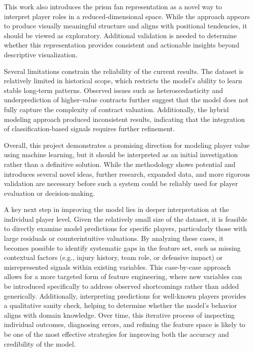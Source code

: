 \documentclass[conference]{IEEEtran}
\begin{document}
This work also introduces the prism fan representation as a novel way to interpret player roles in a reduced-dimensional space. While the approach appears to produce visually meaningful structure and aligns with positional tendencies, it should be viewed as exploratory. Additional validation is needed to determine whether this representation provides consistent and actionable insights beyond descriptive visualization.

Several limitations constrain the reliability of the current results. The dataset is relatively limited in historical scope, which restricts the model's ability to learn stable long-term patterns. Observed issues such as heteroscedasticity and underprediction of higher-value contracts further suggest that the model does not fully capture the complexity of contract valuation. Additionally, the hybrid modeling approach produced inconsistent results, indicating that the integration of classification-based signals requires further refinement.

Overall, this project demonstrates a promising direction for modeling player value using machine learning, but it should be interpreted as an initial investigation rather than a definitive solution. While the methodology shows potential and introduces several novel ideas, further research, expanded data, and more rigorous validation are necessary before such a system could be reliably used for player evaluation or decision-making.

A key next step in improving the model lies in deeper interpretation at the individual player level. Given the relatively small size of the dataset, it is feasible to directly examine model predictions for specific players, particularly those with large residuals or counterintuitive valuations. By analyzing these cases, it becomes possible to identify systematic gaps in the feature set, such as missing contextual factors (e.g., injury history, team role, or defensive impact) or misrepresented signals within existing variables. This case-by-case approach allows for a more targeted form of feature engineering, where new variables can be introduced specifically to address observed shortcomings rather than added generically. Additionally, interpreting predictions for well-known players provides a qualitative sanity check, helping to determine whether the model's behavior aligns with domain knowledge. Over time, this iterative process of inspecting individual outcomes, diagnosing errors, and refining the feature space is likely to be one of the most effective strategies for improving both the accuracy and credibility of the model.
\end{document}
